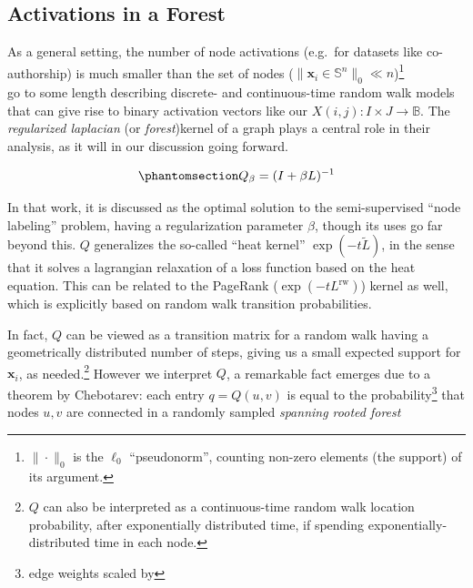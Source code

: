 \documentclass[%
	12pt,
		oneside,
		letterpaper
]{book}
\begin{document}
\subsection{Activations in a Forest}\label{activations-in-a-forest}

As a general setting, the number of node activations (e.g.~for datasets
like co-authorship) is much smaller than the set of nodes
(\(\|\mathbf{x}_i\in\mathbb{S}^n\|_0 \ll n\))\footnote{ \(\|\cdot\|_0\)
  is the \(\ell_0\) ``pseudonorm'', counting non-zero elements (the
  support) of its argument.}\\
\textcite{Semisupervisedlearning_Avrachenkov2017} go to some length
describing discrete- and continuous-time random walk models that can
give rise to binary activation vectors like our
\(X(i,j):I\times J\rightarrow \mathbb{B}\). The \emph{regularized
laplacian} (or \emph{forest})kernel of a
graph\autocite{SimilaritiesgraphsKernels_Avrachenkov2019} plays a
central role in their analysis, as it will in our discussion going
forward.

\begin{equation}\phantomsection\label{eq-regulap}{
Q_{\beta} = (I+\beta L)^{-1}
}\end{equation}

In that work, it is discussed as the optimal solution to the
semi-supervised ``node labeling'' problem, having a regularization
parameter \(\beta\), though its uses go far beyond
this.\autocite{GraphLaplacianRegularization_Pang2017,Countingrootedforests_Knill2013,MatrixForestTheorem_Chebotarev2006}
\(Q\) generalizes the so-called ``heat kernel'' \(\exp{(-t\tilde{L})}\),
in the sense that it solves a lagrangian relaxation of a loss function
based on the heat equation. This can be related to the PageRank
(\(\exp{(-tL^{\text{rw}})}\)) kernel as well, which is explicitly based
on random walk transition probabilities.

In fact, \(Q\) can be viewed as a transition matrix for a random walk
having a geometrically distributed number of steps, giving us a small
expected support for \(\mathbf{x}_i\), as needed.\footnote{\(Q\) can
  also be interpreted as a continuous-time random walk location
  probability, after exponentially distributed time, if spending
  exponentially-distributed time in each node.} However we interpret
\(Q\), a remarkable fact emerges due to a theorem by Chebotarev: each
entry \(q=Q(u,v)\) is equal to the probability\footnote{edge weights
  scaled by \beta} that nodes \(u,v\) are connected in a randomly
sampled \emph{spanning rooted forest}
\end{document}

